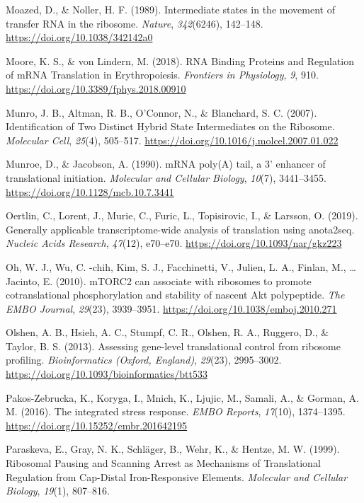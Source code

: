 \documentclass[12pt,openany]{book}
\begin{document}
\hypertarget{ref-Moazed1989}{}
Moazed, D., \& Noller, H. F. (1989). Intermediate states in the movement
of transfer RNA in the ribosome. \emph{Nature}, \emph{342}(6246),
142--148. \url{https://doi.org/10.1038/342142a0}

\hypertarget{ref-Moore2018}{}
Moore, K. S., \& von Lindern, M. (2018). RNA Binding Proteins and
Regulation of mRNA Translation in Erythropoiesis. \emph{Frontiers in
Physiology}, \emph{9}, 910.
\url{https://doi.org/10.3389/fphys.2018.00910}

\hypertarget{ref-Munro2007}{}
Munro, J. B., Altman, R. B., O'Connor, N., \& Blanchard, S. C. (2007).
Identification of Two Distinct Hybrid State Intermediates on the
Ribosome. \emph{Molecular Cell}, \emph{25}(4), 505--517.
\url{https://doi.org/10.1016/j.molcel.2007.01.022}

\hypertarget{ref-Munroe1990}{}
Munroe, D., \& Jacobson, A. (1990). mRNA poly(A) tail, a 3' enhancer of
translational initiation. \emph{Molecular and Cellular Biology},
\emph{10}(7), 3441--3455. \url{https://doi.org/10.1128/mcb.10.7.3441}

\hypertarget{ref-Oertlin2019}{}
Oertlin, C., Lorent, J., Murie, C., Furic, L., Topisirovic, I., \&
Larsson, O. (2019). Generally applicable transcriptome-wide analysis of
translation using anota2seq. \emph{Nucleic Acids Research},
\emph{47}(12), e70--e70. \url{https://doi.org/10.1093/nar/gkz223}

\hypertarget{ref-Oh2010}{}
Oh, W. J., Wu, C. -chih, Kim, S. J., Facchinetti, V., Julien, L. A.,
Finlan, M., \ldots{} Jacinto, E. (2010). mTORC2 can associate with
ribosomes to promote cotranslational phosphorylation and stability of
nascent Akt polypeptide. \emph{The EMBO Journal}, \emph{29}(23),
3939--3951. \url{https://doi.org/10.1038/emboj.2010.271}

\hypertarget{ref-Olshen2013}{}
Olshen, A. B., Hsieh, A. C., Stumpf, C. R., Olshen, R. A., Ruggero, D.,
\& Taylor, B. S. (2013). Assessing gene-level translational control from
ribosome profiling. \emph{Bioinformatics (Oxford, England)},
\emph{29}(23), 2995--3002.
\url{https://doi.org/10.1093/bioinformatics/btt533}

\hypertarget{ref-Pakos-Zebrucka2016}{}
Pakos-Zebrucka, K., Koryga, I., Mnich, K., Ljujic, M., Samali, A., \&
Gorman, A. M. (2016). The integrated stress response. \emph{EMBO
Reports}, \emph{17}(10), 1374--1395.
\url{https://doi.org/10.15252/embr.201642195}

\hypertarget{ref-Paraskeva1999}{}
Paraskeva, E., Gray, N. K., Schläger, B., Wehr, K., \& Hentze, M. W.
(1999). Ribosomal Pausing and Scanning Arrest as Mechanisms of
Translational Regulation from Cap-Distal Iron-Responsive Elements.
\emph{Molecular and Cellular Biology}, \emph{19}(1), 807--816.
\end{document}
